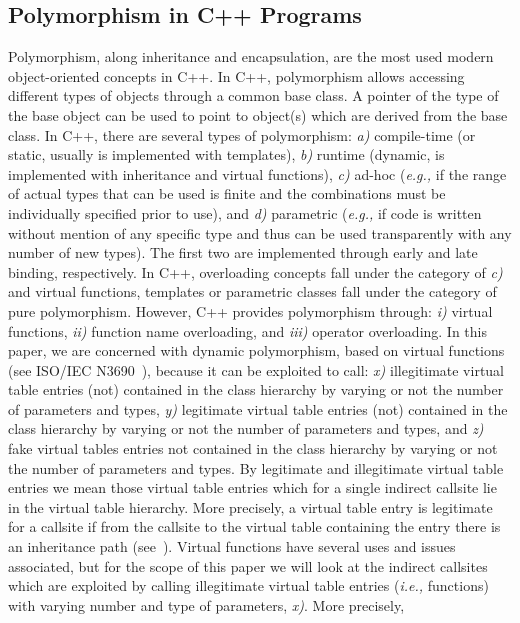 \subsection{Polymorphism in C++ Programs}
\label{Polymorphism in C++}
Polymorphism, along inheritance and encapsulation, are the most used modern object-oriented concepts in C++. In C++, polymorphism allows accessing different types of objects through a common base class. A pointer of the type of the base object can be used to point to object(s) which are derived from the base class. In C++, there are several types of polymorphism:
\textit{a)} compile-time (or static, usually is implemented with templates), 
\textit{b)} runtime (dynamic, is implemented with inheritance and virtual functions), 
\textit{c)} ad-hoc (\textit{e.g.,} if the range of actual types that can be used is finite and the combinations must be individually specified prior to use), and
\textit{d)} parametric (\textit{e.g.,} if code is written without mention of any specific type and thus can be used transparently with any number of new types). 
The first two are implemented through early and late binding, respectively. In C++, overloading concepts fall under the category of \textit{c)} and virtual functions, templates or parametric classes fall under the category of pure polymorphism. However, C++ provides polymorphism through: 
\textit{i)} virtual functions,
\textit{ii)} function name overloading, and 
\textit{iii)} operator overloading. 
In this paper, we are concerned with dynamic polymorphism, based on virtual functions (see ISO/IEC N3690~\cite{iso:iecN3690}), because it can be exploited to call: 
\textit{x)} illegitimate virtual table entries (not) contained in the class hierarchy by varying or not the number of parameters and types,
\textit{y)} legitimate virtual table entries (not) contained in the class hierarchy by varying or not the number of parameters and types, and 
\textit{z)} fake virtual tables entries not contained in the class hierarchy by varying or not the number of parameters and types.
By legitimate and illegitimate virtual table entries we mean those virtual table entries which for a single indirect callsite lie in the virtual table hierarchy. More precisely, a virtual table entry is legitimate for a callsite if from the callsite to the virtual table containing the entry there is an inheritance path (see~\cite{haller:shrinkwrap}). Virtual functions have several uses and issues associated, but for the scope of this paper we will look at the indirect callsites which are exploited by calling illegitimate virtual table entries (\textit{i.e.,} functions) with varying number and type of parameters, \textit{x)}. More precisely, 
